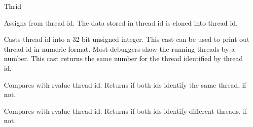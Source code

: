 \begin{classpage}{Thrid}
\begin{mandescription}
  Assigns  from  thread id. The data
  stored in  thread id is cloned into  thread id.

  Casts  thread id into a 32 bit unsigned integer. This
  cast can be used to print out  thread id in numeric
  format. Most debuggers show the running threads by a number. This
  cast returns the same number for the thread identified by
   thread id.

  Compares  with  rvalue thread id.
  Returns  if both ids identify the same thread,
   if not.

  Compares  with  rvalue thread id. Returns
   if both ids identify different threads, 
  if not.


\end{mandescription}
\end{classpage}

